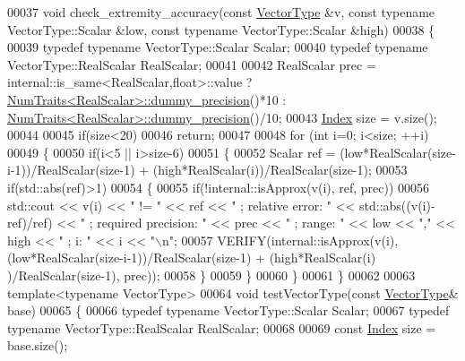\begin{DoxyCode}
00037 \textcolor{keywordtype}{void} check\_extremity\_accuracy(\textcolor{keyword}{const} \hyperlink{struct_vector_type}{VectorType} &v, \textcolor{keyword}{const} \textcolor{keyword}{typename} VectorType::Scalar &low, \textcolor{keyword}{const} \textcolor{keyword}{
      typename} VectorType::Scalar &high)
00038 \{
00039   \textcolor{keyword}{typedef} \textcolor{keyword}{typename} VectorType::Scalar Scalar;
00040   \textcolor{keyword}{typedef} \textcolor{keyword}{typename} VectorType::RealScalar RealScalar;
00041 
00042   RealScalar prec = internal::is\_same<RealScalar,float>::value ? 
      \hyperlink{group___core___module_struct_eigen_1_1_num_traits}{NumTraits<RealScalar>::dummy\_precision}()*10 : 
      \hyperlink{group___core___module_struct_eigen_1_1_num_traits}{NumTraits<RealScalar>::dummy\_precision}()/10;
00043   \hyperlink{namespace_eigen_a62e77e0933482dafde8fe197d9a2cfde}{Index} size = v.size();
00044 
00045   \textcolor{keywordflow}{if}(size<20)
00046     \textcolor{keywordflow}{return};
00047 
00048   \textcolor{keywordflow}{for} (\textcolor{keywordtype}{int} i=0; i<size; ++i)
00049   \{
00050     \textcolor{keywordflow}{if}(i<5 || i>size-6)
00051     \{
00052       Scalar ref = (low*RealScalar(size-i-1))/RealScalar(size-1) + (high*RealScalar(i))/RealScalar(size-1);
00053       \textcolor{keywordflow}{if}(std::abs(ref)>1)
00054       \{
00055         \textcolor{keywordflow}{if}(!internal::isApprox(v(i), ref, prec))
00056           std::cout << v(i) << \textcolor{stringliteral}{" != "} << ref << \textcolor{stringliteral}{"  ; relative error: "} << std::abs((v(i)-ref)/ref) << \textcolor{stringliteral}{"  ;
       required precision: "} << prec << \textcolor{stringliteral}{"  ; range: "} << low << \textcolor{stringliteral}{","} << high << \textcolor{stringliteral}{"  ; i: "} << i << \textcolor{stringliteral}{"\(\backslash\)n"};
00057         VERIFY(internal::isApprox(v(i), (low*RealScalar(size-i-1))/RealScalar(size-1) + (high*RealScalar(i)
      )/RealScalar(size-1), prec));
00058       \}
00059     \}
00060   \}
00061 \}
00062 
00063 \textcolor{keyword}{template}<\textcolor{keyword}{typename} VectorType>
00064 \textcolor{keywordtype}{void} testVectorType(\textcolor{keyword}{const} \hyperlink{struct_vector_type}{VectorType}& base)
00065 \{
00066   \textcolor{keyword}{typedef} \textcolor{keyword}{typename} VectorType::Scalar Scalar;
00067   \textcolor{keyword}{typedef} \textcolor{keyword}{typename} VectorType::RealScalar RealScalar;
00068 
00069   \textcolor{keyword}{const} \hyperlink{namespace_eigen_a62e77e0933482dafde8fe197d9a2cfde}{Index} size = base.size();

\end{DoxyCode}
